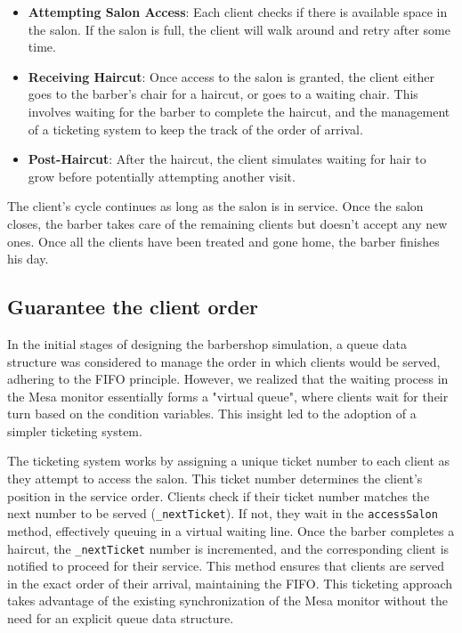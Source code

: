 \documentclass{article}
\begin{document}
    \begin{itemize}
        \item \textbf{Attempting Salon Access}: Each client checks if there is available space in the salon. If the salon is full, the client will walk around and retry after some time.
        \item \textbf{Receiving Haircut}: Once access to the salon is granted, the client either goes to the barber's chair for a haircut, or goes to a waiting chair. This involves waiting for the barber to complete the haircut, and the management of a ticketing system to keep the track of the order of arrival.
        \item \textbf{Post-Haircut}: After the haircut, the client simulates waiting for hair to grow before potentially attempting another visit.
    \end{itemize}

    The client's cycle continues as long as the salon is in service.
    Once the salon closes, the barber takes care of the remaining clients but doesn't accept any new ones.
    Once all the clients have been treated and gone home, the barber finishes his day.

    \subsection{Guarantee the client order}

    In the initial stages of designing the barbershop simulation, a queue data structure was considered to manage the order in which clients would be served, adhering to the FIFO principle.
    However, we realized that the waiting process in the Mesa monitor essentially forms a "virtual queue", where clients wait for their turn based on the condition variables.
    This insight led to the adoption of a simpler ticketing system.

    The ticketing system works by assigning a unique ticket number to each client as they attempt to access the salon.
    This ticket number determines the client's position in the service order.
    Clients check if their ticket number matches the next number to be served (\texttt{\_nextTicket}).
    If not, they wait in the \texttt{accessSalon} method, effectively queuing in a virtual waiting line.
    Once the barber completes a haircut, the \texttt{\_nextTicket} number is incremented, and the corresponding client is notified to proceed for their service.
    This method ensures that clients are served in the exact order of their arrival, maintaining the FIFO.
    This ticketing approach takes advantage of the existing synchronization of the Mesa monitor without the need for an explicit queue data structure.
\end{document}
